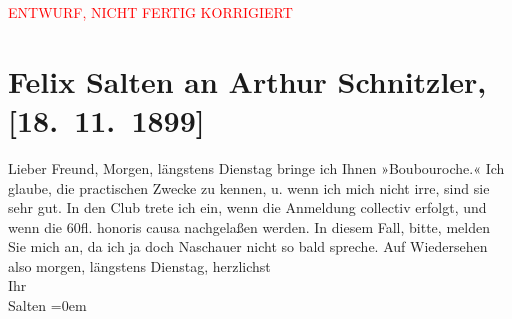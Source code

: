
\begin{center}
            \textcolor{red}{ENTWURF, NICHT FERTIG KORRIGIERT}
                      \end{center}
            
         
         \renewcommand{\erwaehntePersonen}{Personen: Paul Naschauer}
         \renewcommand{\erwaehnteInstitutionen}{Institutionen: Wiener Schachclub}
         \renewcommand{\erwaehnteOrte}{Orte: Wien}
         \renewcommand{\erwaehnteWerke}{Werke: Boubouroche. Tragische Posse in zwei Akten}
               \section[Felix Salten an Arthur Schnitzler, {[}18. 11. 1899{]}]{ Felix Salten an Arthur Schnitzler, {[}18. 11. 1899{]}}\nopagebreak{}\rehead{ }\begin{ledgroupsized}[t]{13cm}\normalsize\beginnumbering \toendnotes[C]{\smallbreak\pagebreak[2]} 
\toendnotes[C]{\smallbreak}\pstart{}{\pb}Lieber Freund,
               \pend\pstart
           Morgen, längstens Dienstag bringe ich Ihnen »Boubouroche.« Ich glaube, die practischen Zwecke
               zu kennen, u. wenn ich mich nicht irre, sind sie sehr gut. In den Club trete ich ein, wenn die Anmeldung
               collectiv erfolgt, und wenn die 60fl. honoris causa nachgelaßen {\pb}werden. In diesem Fall, bitte,
               melden Sie mich an, da ich ja doch Naschauer
               nicht so bald spreche. Auf Wiedersehen also morgen, längstens Dienstag, \pend
           \pstart
           herzlichst {\\[\baselineskip]}Ihr {\\[\baselineskip]}\spacefill\mbox{Salten}\pend
           \leftskip=0em{}
         
         \endnumbering{}\end{ledgroupsized}\begin{anhang}\end{anhang}\newcommand{\dateiname}{L03302}\newcommand{\titel}{Felix Salten an Arthur Schnitzler, [18. 11. 1899]}\newcommand{\editorInnen}{Martin Anton Müller und Laura Untner}
      